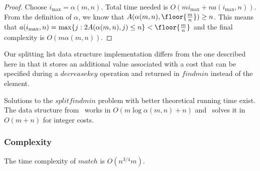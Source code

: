 \begin{proof}
    Choose $i_{\max} = \alpha(m,n)$. Total time needed is $O(mi_{\max} + na(i_{\max},n))$. From the definition of $\alpha$, we know that $A(\alpha(m,n), \floor{\frac{m}{n}}) \geq n$. This means that $a(i_{\max},n) = \max \{ j: 2A(\alpha(m,n), j) \leq n \} < \floor{\frac{m}{n}}$ and the final complexity is $O(m\alpha(m,n))$.
\end{proof}

Our splitting list data structure implementation differs from the one described here in that it stores an additional value associated with a cost that can be specified during a $decreasekey$ operation and returned in $findmin$ instead of the element.


Solutions to the $splitfindmin$ problem with better theoretical running time exist. The data structure from~\cite{pettie2005sensitivity} works in $O(m \log \alpha(m, n) + n)$ and~\cite{thorup2007equivalence} solves it in $O(m + n)$ for integer costs.

\subsubsection{Complexity}

\begin{theorem}
    The time complexity of $match$ is $O(n^{3/4}m)$.
\end{theorem}

